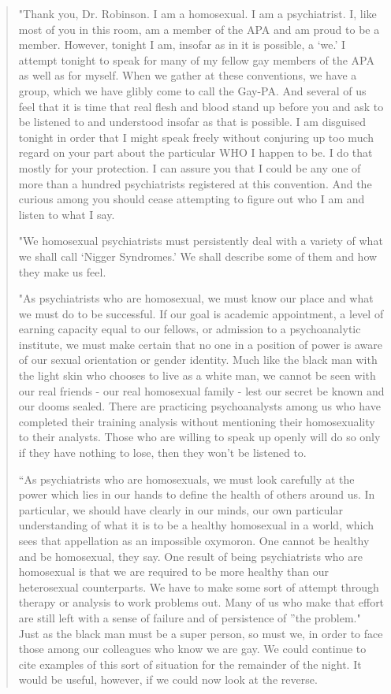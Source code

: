 \begin{refsection}
\begin{quote}
"Thank you, Dr. Robinson. I am a homosexual. I am a psychiatrist. I, like most of you in this room, am a member of the APA and am proud to be a member. However, tonight I am, insofar as in it is possible, a ‘we.’ I attempt tonight to speak for many of my fellow gay members of the APA as well as for myself. When we gather at these conventions, we have a group, which we have glibly come to call the Gay-PA. And several of us feel that it is time that real flesh and blood stand up before you and ask to be listened to and understood insofar as that is possible. I am disguised tonight in order that I might speak freely without conjuring up too much regard on your part about the particular WHO I happen to be. I do that mostly for your protection. I can assure you that I could be any one of more than a hundred psychiatrists registered at this convention. And the curious among you should cease attempting to figure out who I am and listen to what I say.

"We homosexual psychiatrists must persistently deal with a variety of what we shall call ‘Nigger Syndromes.’ We shall describe some of them and how they make us feel.

"As psychiatrists who are homosexual, we must know our place and what we must do to be successful. If our goal is academic appointment, a level of earning capacity equal to our fellows, or admission to a psychoanalytic institute, we must make certain that no one in a position of power is aware of our sexual orientation or gender identity. Much like the black man with the light skin who chooses to live as a white man, we cannot be seen with our real friends - our real homosexual family - lest our secret be known and our dooms sealed. There are practicing psychoanalysts among us who have completed their training analysis without mentioning their homosexuality to their analysts. Those who are willing to speak up openly will do so only if they have nothing to lose, then they won’t be listened to.

``As psychiatrists who are homosexuals, we must look carefully at the power which lies in our hands to define the health of others around us. In particular, we should have clearly in our minds, our own particular understanding of what it is to be a healthy homosexual in a world, which sees that appellation as an impossible oxymoron. One cannot be healthy and be homosexual, they say. One result of being psychiatrists who are homosexual is that we are required to be more healthy than our heterosexual counterparts. We have to make some sort of attempt through therapy or analysis to work problems out. Many of us who make that effort are still left with a sense of failure and of persistence of ''the problem." Just as the black man must be a super person, so must we, in order to face those among our colleagues who know we are gay. We could continue to cite examples of this sort of situation for the remainder of the night. It would be useful, however, if we could now look at the reverse.


\end{quote}
\end{refsection}
